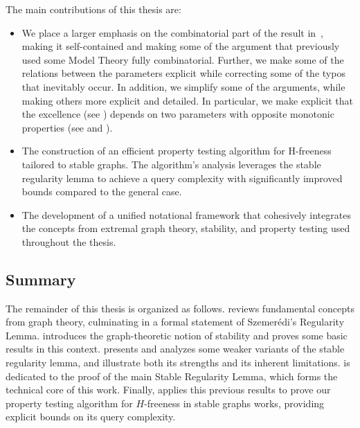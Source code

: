         The main contributions of this thesis are:
        \begin{itemize}
            \item We place a larger emphasis on the combinatorial part of the result
                in~\cite{regularity_lemmas_for_stable_graphs}, making it self-contained and making some of the argument that
                previously used some Model Theory fully combinatorial.
                Further, we make some of the relations between the parameters explicit while correcting some of the typos
                that inevitably occur.
                In addition, we simplify some of the arguments, while making others more explicit and detailed.
                In particular, we make explicit that the excellence (see ) depends on two parameters
                with opposite monotonic properties (see  and ).
            \item The construction of an efficient property testing algorithm for H-freeness tailored to stable graphs.
                The algorithm's analysis leverages the stable regularity lemma to achieve a query complexity with significantly
                improved bounds compared to the general case.
            \item The development of a unified notational framework that cohesively integrates the concepts from
                extremal graph theory, stability, and property testing used throughout the thesis.
        \end{itemize}

    \subsection{Summary} \label{subsec:summary}

        The remainder of this thesis is organized as follows.
         reviews fundamental concepts from graph theory, culminating in a formal statement of Szemer\'edi's
        Regularity Lemma.
         introduces the graph-theoretic notion of stability and proves some basic results in this context.
         presents and analyzes some weaker variants of the stable regularity lemma, and illustrate both its
        strengths and its inherent limitations.
         is dedicated to the proof of the main Stable Regularity Lemma, which forms the technical core of this
        work.
        Finally,  applies this previous results to prove our property testing algorithm for
        $H$-freeness in stable graphs works, providing explicit bounds on its query complexity.
